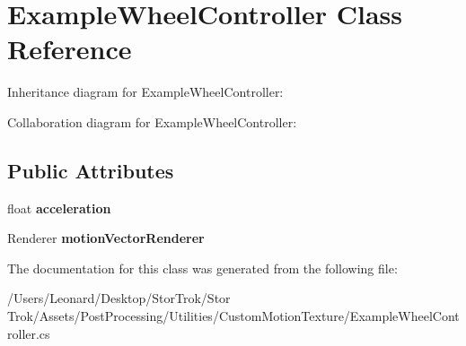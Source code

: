 \hypertarget{class_example_wheel_controller}{}\section{Example\+Wheel\+Controller Class Reference}
\label{class_example_wheel_controller}


Inheritance diagram for Example\+Wheel\+Controller\+:


Collaboration diagram for Example\+Wheel\+Controller\+:
\subsection*{Public Attributes}
\begin{DoxyCompactItemize}
\item 
\mbox{\label{class_example_wheel_controller_a4da6bd05730ce6b82fbf340e1edd6c58}} 
float {\bfseries acceleration}
\item 
\mbox{\label{class_example_wheel_controller_ae7f3dc107a18fda83dff42269da86c00}} 
Renderer {\bfseries motion\+Vector\+Renderer}
\end{DoxyCompactItemize}


The documentation for this class was generated from the following file\+:\begin{DoxyCompactItemize}
\item 
/\+Users/\+Leonard/\+Desktop/\+Stor\+Trok/\+Stor Trok/\+Assets/\+Post\+Processing/\+Utilities/\+Custom\+Motion\+Texture/Example\+Wheel\+Controller.\+cs\end{DoxyCompactItemize}
